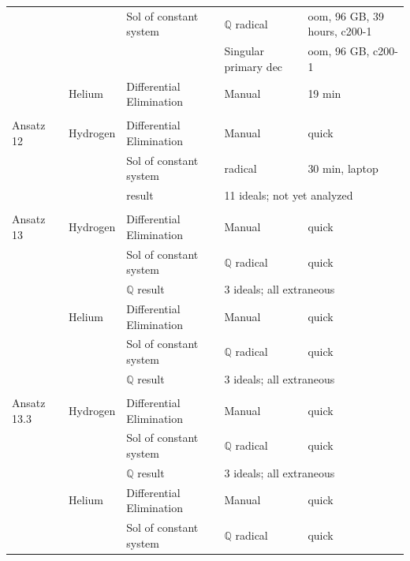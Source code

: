 \documentclass{article}
\begin{document}
\begin{longtable}{lllll}
           &               &Sol of constant system   &$\mathbb{Q}$ radical  &oom, 96 GB, 39 hours, c200-1\\
           &               &                         &Singular primary dec  &oom, 96 GB, c200-1\\
           &Helium         &Differential Elimination &Manual                &19 min\\
           &               &                         &                      &\\
Ansatz 12  &Hydrogen       &Differential Elimination &Manual                &quick\\
           &               &Sol of constant system   &\R32003 radical       &30 min, laptop\\
           &               &\R32003 result            &\multicolumn{2}{l}{11 ideals; not yet analyzed}\\
           &               &                         &                      &\\
Ansatz 13  &Hydrogen       &Differential Elimination &Manual                &quick\\
           &               &Sol of constant system   &$\mathbb{Q}$ radical             &quick\\
           &               &$\mathbb{Q}$ result                 &\multicolumn{2}{l}{3 ideals; all extraneous}\\
           &Helium         &Differential Elimination &Manual                &quick\\
           &               &Sol of constant system   &$\mathbb{Q}$ radical             &quick\\
           &               &$\mathbb{Q}$ result                 &\multicolumn{2}{l}{3 ideals; all extraneous}\\
           &               &                         &                      &\\
Ansatz 13.3&Hydrogen       &Differential Elimination &Manual                &quick\\
           &               &Sol of constant system   &$\mathbb{Q}$ radical             &quick\\
           &               &$\mathbb{Q}$ result                 &\multicolumn{2}{l}{3 ideals; all extraneous}\\
           &Helium         &Differential Elimination &Manual                &quick\\
           &               &Sol of constant system   &$\mathbb{Q}$ radical             &quick\\

\end{longtable}
\end{document}
